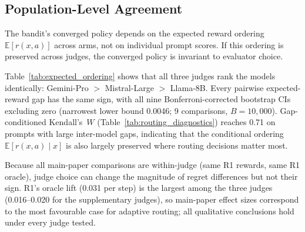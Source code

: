 \subsection{Population-Level Agreement}

The bandit's converged policy depends on the expected reward ordering
$\mathbb{E}[r(x, a)]$ across arms, not on individual prompt scores.
If this ordering is preserved across judges, the converged policy is
invariant to evaluator choice.

\begin{table}[h]
\centering
\caption{Expected reward ordering under each judge ($n = 2{,}000$
prompts; Bonferroni-corrected bootstrap CIs, 9 comparisons,
$B = 10{,}000$).}
\label{tab:expected_ordering}
\small
{}
\end{table}

Table~\ref{tab:expected_ordering} shows that all three judges rank
the models identically: Gemini-Pro $>$ Mistral-Large $>$ Llama-8B.
Every pairwise expected-reward gap has the same sign, with all nine
Bonferroni-corrected bootstrap CIs excluding zero (narrowest lower
bound 0.0046; 9 comparisons, $B = 10{,}000$).
Gap-conditioned Kendall's~$W$ (Table~\ref{tab:routing_diagnostics})
reaches 0.71 on prompts with large inter-model gaps, indicating that
the conditional ordering $\mathbb{E}[r(x,a) \mid x]$ is also largely
preserved where routing decisions matter most.

Because all main-paper comparisons are within-judge (same R1 rewards,
same R1 oracle), judge choice can change the magnitude of regret
differences but not their sign.  R1's oracle lift (0.031 per step) is
the largest among the three judges (0.016--0.020 for the supplementary
judges), so main-paper effect sizes correspond to the most favourable
case for adaptive routing; all qualitative conclusions hold under every
judge tested.

